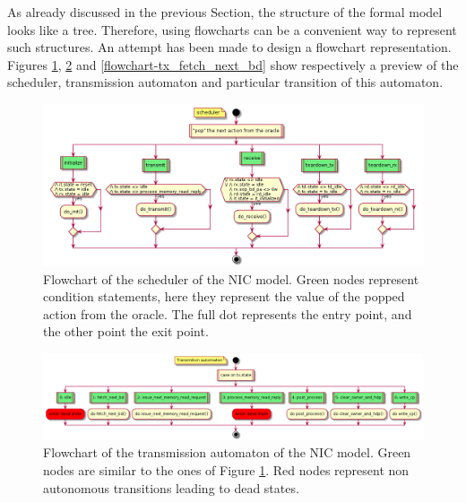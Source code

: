 \documentclass{kththesis}
\begin{document}
{As already discussed in the previous Section, the structure of the formal model looks like a tree. Therefore, using flowcharts can be a convenient way to represent such structures. An attempt has been made to design a flowchart representation. Figures \ref{flowchart-scheduler}, \ref{flowchart-tx} and \ref{flowchart-tx_fetch_next_bd} show respectively a preview of the scheduler, transmission automaton and particular transition of this automaton.

\begin{figure}[p]
	\includegraphics[width=\textwidth]{figures/flowchart-scheduler.png}
	\centering
	\caption{Flowchart of the scheduler of the NIC model. Green nodes represent condition statements, here they represent the value of the popped action from the oracle. The full dot represents the entry point, and the other point the exit point.}
	\label{flowchart-scheduler}
\end{figure}

\begin{figure}[p]
	\includegraphics[width=\textwidth]{figures/flowchart-tx.png}
	\centering
	\caption{Flowchart of the transmission automaton of the NIC model. Green nodes are similar to the ones of Figure \ref{flowchart-scheduler}. Red nodes represent non autonomous transitions leading to dead states.}
	\label{flowchart-tx}
\end{figure}

}
\end{document}

